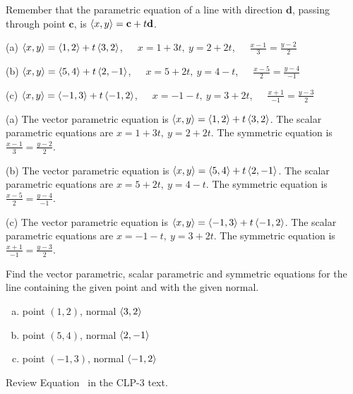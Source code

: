 \begin{hint}
Remember that the parametric equation of a line with direction $\mathbf d$, passing through point $\mathbf c$, is $\left< x,y\right> =\mathbf c + t\mathbf d $.
\end{hint}

\begin{answer}
(a) $\left< x,y\right>=\left< 1,2\right>+t\left< 3,2\right> $,\ \ \ 
    $x=1+3t,\ y=2+2t$,\ \ \ 
    $\frac{x-1}{3}=\frac{y-2}{2}$

(b) $\left< x,y\right>=\left< 5,4\right>+t\left< 2,-1\right> $,\ \ \ 
    $x=5+2t,\ y=4-t$,\ \ \ 
    $\frac{x-5}{2}=\frac{y-4}{-1}$

(c) $\left< x,y\right>=\left< -1,3\right>+t\left< -1,2\right> $,\ \ \ 
    $x=-1-t,\ y=3+2t$,\ \ \ 
    $\frac{x+1}{-1}=\frac{y-3}{2}$
\end{answer}

\begin{solution}
(a)
The vector parametric equation is $\left< x,y\right>=\left< 1,2\right>+t\left< 3,2\right> $.
The scalar parametric equations are $x=1+3t,\ y=2+2t$.
The symmetric equation is $\frac{x-1}{3}=\frac{y-2}{2}$.

(b)
The vector parametric equation is $\left< x,y\right>=\left< 5,4\right>+t\left< 2,-1\right> $.
The scalar parametric equations are $x=5+2t,\ y=4-t$.
The symmetric equation is $\frac{x-5}{2}=\frac{y-4}{-1}$.

(c)
The vector parametric equation is $\left< x,y\right>=\left< -1,3\right>+t\left< -1,2\right> $.
The scalar parametric equations are $x=-1-t,\ y=3+2t$.
The symmetric equation is $\frac{x+1}{-1}=\frac{y-3}{2}$.
\end{solution}

\begin{question}
Find the vector parametric, scalar parametric
 and symmetric equations for the line
containing the given point and with the given normal.
\begin{enumerate}[(a)]
\item point $(1,2)$, normal $\left< 3,2\right> $
\item point $(5,4)$, normal $\left< 2,-1\right> $
\item point $(-1,3)$, normal $\left< -1,2\right> $
\end{enumerate}
\end{question}

\begin{hint}
Review Equation~\eref{CLP200}{eqn line} in the CLP-3 text.%
\end{hint}

